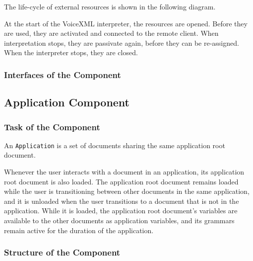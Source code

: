 \documentclass[11pt,a4paper]{article}
\begin{document}
The life-cycle of external resources is shown in the following diagram.
\begin{center}
\end{center}

At the start of the VoiceXML interpreter, the resources are opened. Before they
are used, they are activated and connected to the remote client. When
interpretation stops, they are passivate again, before they can be re-assigned.
When the interpreter stops, they are closed.
\subsubsection{Interfaces of the Component}

\subsection{Application Component}

\subsubsection{Task of the Component}

An \texttt{Application} is a set of documents sharing the same 
application root document.

Whenever the user interacts with a document in an application, its
application root document is also loaded. The application root document
remains loaded while the user is transitioning between other documents in the
same application, and it is unloaded when the user transitions to a document
that is not in the application. While it is loaded, the application root
document's variables are available to the other documents as application
variables, and its grammars remain active for the duration of the
application.

\subsubsection{Structure of the Component}
\end{document}
